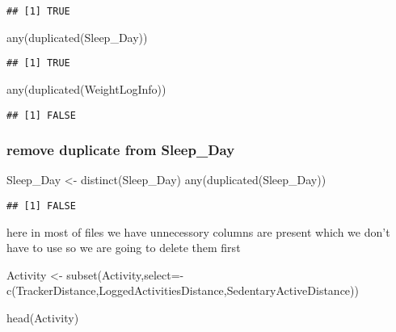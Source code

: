 \documentclass[
]{article}
\newenvironment{Shaded}{\begin{snugshade}}{\end{snugshade}}
\newcommand{\AttributeTok}[1]{\textcolor[rgb]{0.77,0.63,0.00}{#1}}
\newcommand{\FunctionTok}[1]{\textcolor[rgb]{0.00,0.00,0.00}{#1}}
\newcommand{\NormalTok}[1]{#1}
\newcommand{\OtherTok}[1]{\textcolor[rgb]{0.56,0.35,0.01}{#1}}
\newcommand{\SpecialCharTok}[1]{\textcolor[rgb]{0.00,0.00,0.00}{#1}}
\begin{document}
\begin{verbatim}
## [1] TRUE
\end{verbatim}

\begin{Shaded}
\begin{Highlighting}[]
\FunctionTok{any}\NormalTok{(}\FunctionTok{duplicated}\NormalTok{(Sleep\_Day))}
\end{Highlighting}
\end{Shaded}

\begin{verbatim}
## [1] TRUE
\end{verbatim}

\begin{Shaded}
\begin{Highlighting}[]
\FunctionTok{any}\NormalTok{(}\FunctionTok{duplicated}\NormalTok{(WeightLogInfo))}
\end{Highlighting}
\end{Shaded}

\begin{verbatim}
## [1] FALSE
\end{verbatim}

\hypertarget{remove-duplicate-from-sleep_day}{%
\subsubsection{remove duplicate from
Sleep\_Day}\label{remove-duplicate-from-sleep_day}}

\begin{Shaded}
\begin{Highlighting}[]
\NormalTok{Sleep\_Day }\OtherTok{\textless{}{-}} \FunctionTok{distinct}\NormalTok{(Sleep\_Day)}
\FunctionTok{any}\NormalTok{(}\FunctionTok{duplicated}\NormalTok{(Sleep\_Day))}
\end{Highlighting}
\end{Shaded}

\begin{verbatim}
## [1] FALSE
\end{verbatim}

here in most of files we have unnecessory columns are present which we
don't have to use so we are going to delete them first

\begin{Shaded}
\begin{Highlighting}[]
\NormalTok{Activity }\OtherTok{\textless{}{-}} \FunctionTok{subset}\NormalTok{(Activity,}\AttributeTok{select=}\SpecialCharTok{{-}}\FunctionTok{c}\NormalTok{(TrackerDistance,LoggedActivitiesDistance,SedentaryActiveDistance))}

\FunctionTok{head}\NormalTok{(Activity)}
\end{Highlighting}
\end{Shaded}
\end{document}
